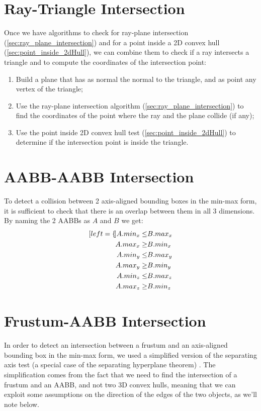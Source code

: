 \documentclass{PoliMi_MasterThesis}
\begin{document}
\section{Ray-Triangle Intersection} \label{sec:ray_triangle_intersection}
Once we have algorithms to check for ray-plane intersection (\ref{sec:ray_plane_intersection}) and for a point inside a 2D convex hull (\ref{sec:point_inside_2dHull}), we can combine them to check if a ray intersects a triangle and to compute the coordinates of the intersection point:

\begin{enumerate}
	\item Build a plane that has as normal the normal to the triangle, and as point any vertex of the triangle;
	\item Use the ray-plane intersection algorithm (\ref{sec:ray_plane_intersection}) to find the coordinates of the point where the ray and the plane collide (if any);
	\item Use the point inside 2D convex hull test (\ref{sec:point_inside_2dHull}) to determine if the intersection point is inside the triangle.
\end{enumerate}

\section{AABB-AABB Intersection} \label{sec:aabb_aabb_intersection}
To detect a collision between 2 axis-aligned bounding boxes in the min-max form, it is sufficient to check that there is an overlap between them in all 3 dimensions. By naming the 2 AABBs as $A$ and $B$ we get:
\begin{subequations}
	\begin{align*}[left=\empheqlbrace]
		A.min_x \leq& B.max_x \\
		A.max_x \geq& B.min_x \\
		A.min_y \leq& B.max_y \\
		A.max_y \geq& B.min_y \\
		A.min_z \leq& B.max_z \\
		A.max_z \geq& B.min_z
	\end{align*}
\end{subequations}

\section{Frustum-AABB Intersection} \label{sec:frustum_aabb_intersection}
In order to detect an intersection between a frustum and an axis-aligned bounding box in the min-max form, we used a simplified version of the separating axis test (a special case of the separating hyperplane theorem) \cite{separating_axis_test}. The simplification comes from the fact that we need to find the intersection of a frustum and an AABB, and not two 3D convex hulls, meaning that we can exploit some assumptions on the direction of the edges of the two objects, as we'll note below.
\end{document}
